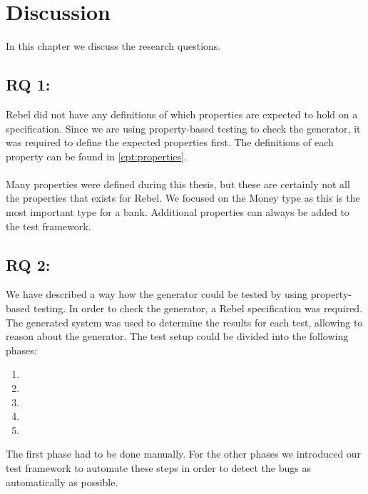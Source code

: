 \chapter{Discussion}
\label{cpt:discussion}
In this chapter we discuss the research questions.

\section{RQ 1: \rqOne{}}
Rebel did not have any definitions of which properties are expected to hold on a
specification. Since we are using property-based testing to check the generator,
it was required to define the expected properties first. The definitions of each
property can be found in \autoref{cpt:properties}.\\
\\
Many properties were defined during this thesis, but these are certainly not all
the properties that exists for Rebel. We focused on the Money type as this is
the most important type for a bank. Additional properties can always be added to
the test framework.

\section{RQ 2: \rqTwo{}}
We have described a way how the generator could be tested by using property-based testing. In order to check the generator, a Rebel specification was required. The generated system was used to determine the results for each test, allowing to reason about the generator. The test setup could be divided into the following phases:
\begin{enumerate}
  \item \tfPhaseOne{}
  \item \tfPhaseTwo{}
  \item \tfPhaseThree{}
  \item \tfPhaseFour{}
  \item \tfPhaseFive{}
\end{enumerate}
The first phase had to be done manually. For the other phases we introduced our test framework to automate these steps in order to detect the bugs as automatically as possible.

